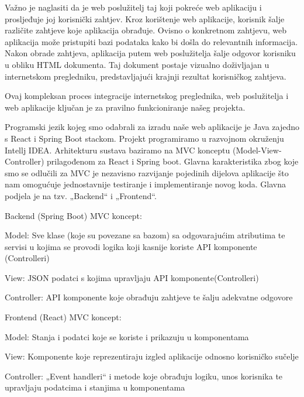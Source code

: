 	Važno je naglasiti da je web poslužitelj taj koji pokreće web aplikaciju i prosljeđuje joj korisnički zahtjev. Kroz korištenje web aplikacije, korisnik šalje različite zahtjeve koje aplikacija obrađuje. Ovisno o konkretnom zahtjevu, web aplikacija može pristupiti bazi podataka kako bi došla do relevantnih informacija. Nakon obrade zahtjeva, aplikacija putem web poslužitelja šalje odgovor korisniku u obliku HTML dokumenta. Taj dokument postaje vizualno doživljajan u internetskom pregledniku, predstavljajući krajnji rezultat korisničkog zahtjeva.

	Ovaj kompleksan proces integracije internetskog preglednika, web poslužitelja i web aplikacije ključan je za pravilno funkcioniranje našeg projekta. 
	
	Programski jezik kojeg smo odabrali za izradu naše web aplikacije je Java zajedno s React i Spring Boot stackom. Projekt programiramo u razvojnom okruženju Intellj IDEA. Arhitekturu sustava baziramo na MVC konceptu (Model-View-Controller) prilagođenom za React i Spring boot. Glavna karakteristika zbog koje smo se odlučili za MVC je nezavisno razvijanje pojedinih dijelova aplikacije što nam omogućuje jednostavnije testiranje i implementiranje novog koda. Glavna podjela je na tzv. „Backend“ i „Frontend“.
	
	Backend (Spring Boot) MVC koncept:
	
	\begin{packed_enum}
	
		\item Model: Sve klase (koje su povezane sa bazom) sa odgovarajućim atributima te servisi u kojima se provodi logika koji kasnije koriste API komponente (Controlleri)
		\item View: JSON podatci s kojima upravljaju API komponente(Controlleri)
		\item Controller: API komponente koje obrađuju zahtjeve te šalju adekvatne odgovore
							
	\end{packed_enum}
	
	Frontend (React) MVC koncept:
	
	\begin{packed_enum}
	
		\item Model: Stanja i podatci koje se koriste i prikazuju u komponentama
		\item View: Komponente koje reprezentiraju izgled aplikacije odnosno korisničko sučelje
		\item Controller: „Event handleri“ i metode koje obrađuju logiku, unos korisnika te upravljaju podatcima i stanjima u komponentama 
							
	\end{packed_enum}
		

